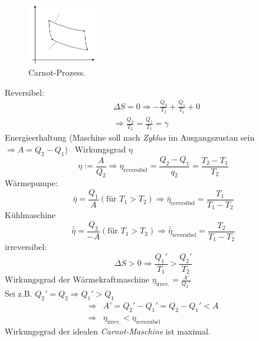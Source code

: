 \begin{enumerate}
    \begin{figure}[H]
        \begin{center}
            \includegraphics[width=0.3\textwidth]{../img/carnotprocess.pdf}
            \caption{Carnot-Prozess.}
            \label{img:carnot}
        \end{center}
    \end{figure}
    
    Reversibel:
    \begin{equation}
        \begin{split}
            & \Delta S = 0 \Rightarrow - \frac{Q_2}{T_2} + \frac{Q_1}{T_1} + 0  \\
            & \Rightarrow \frac{Q_2}{T_2} = \frac{Q_1}{T_1} = \gamma
        \end{split}
    \end{equation}
    Energieerhaltung (Maschine soll nach \emph{Zyklus} im Ausgangszustan sein $\Rightarrow A = Q_2 - Q_1$) \
    Wirkungsgrad $\eta$
    \begin{equation}
        \eta := \frac{A}{Q_2} \Rightarrow \eta_{\text{reversibel}} = \frac{Q_2 - Q_1}{q_2} = \frac{T_2 - T_1}{T_2}
    \end{equation}
    Wärmepumpe:
    \begin{equation}
        \bar{\eta} = \frac{Q_1}{A} (\text{für } T_1 > T_2) \Rightarrow \bar{\eta}_{\text{reversibel}} = \frac{T_1}{T_1 - T_2}
    \end{equation}
    Kühlmaschine
    \begin{equation}
        \bar{\bar{\eta}} = \frac{Q_2}{-A} (\text{für } T_1 > T_2) \Rightarrow \bar{\bar{\eta}}_{\text{reversibel}} = \frac{T_2}{T_1-T_2}
    \end{equation}
    irreversibel:
    \begin{equation}
        \Delta S > 0 \Rightarrow \frac{Q_1'}{T_1} > \frac{Q_2'}{T_2}
    \end{equation}
    Wirkungsgrad der Wärmekraftmaschine $\eta_{\text{irrev.}} = \frac{A'}{Q_2'}$ \\
    Sei z.B. $Q_2' = Q_2 \Rightarrow Q_1' > Q_1$
    \begin{equation}
        \begin{split}
            \Rightarrow & A' = Q_2' - Q_1' = Q_2 - Q_1' < A \\
            \Rightarrow & \eta_\text{irrev.} < \eta_\text{reversibel}
        \end{split}
    \end{equation}
    Wirkungsgrad der idealen \emph{Carnot-Maschine} ist maximal.
\end{enumerate}

